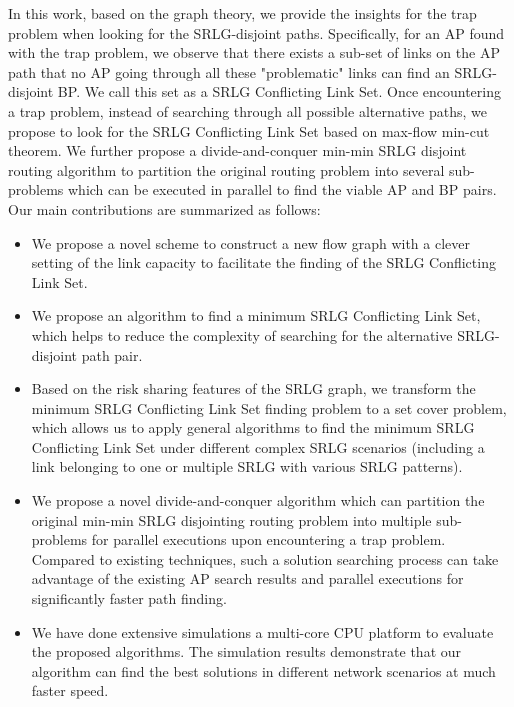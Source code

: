 In this work, based on the graph theory, we provide the insights for the trap problem when looking for the SRLG-disjoint paths. Specifically, for an AP found with the trap problem, we observe that there exists a sub-set of links on the AP path that no AP going through all these "problematic" links can find an SRLG-disjoint BP. We call this set as a SRLG Conflicting Link Set. Once encountering a trap problem, instead of searching through all possible alternative paths, we propose to look for the SRLG Conflicting Link Set based on max-flow min-cut theorem\cite{ford2015flows}. We further propose a divide-and-conquer min-min SRLG disjoint routing algorithm to partition the original routing problem into several sub-problems which can be executed in parallel to find the viable AP and BP pairs. Our main contributions are summarized as follows:
\begin{itemize}
  \item We propose a novel scheme to construct a new flow graph with a clever setting of the link capacity to facilitate the finding of the SRLG Conflicting Link Set.
  \item We propose an algorithm to find a  minimum SRLG Conflicting Link Set, which helps to reduce the complexity of searching for the alternative SRLG-disjoint path pair.
  \item Based on the risk sharing features of the SRLG graph, we transform the minimum SRLG Conflicting Link Set finding problem to a set cover problem, which allows us to apply general algorithms to find the minimum SRLG Conflicting Link Set under different complex SRLG scenarios (including a link belonging to one or multiple SRLG with various SRLG patterns).
  \item We propose a novel divide-and-conquer algorithm which can partition the original min-min SRLG disjointing routing problem into multiple sub-problems for parallel executions upon encountering a trap problem.
      Compared to existing techniques, such a solution searching process can take advantage of the existing AP search results and parallel executions for significantly faster path finding.
  \item  We have done extensive simulations  a multi-core CPU platform to evaluate the proposed algorithms. The simulation results demonstrate that our algorithm can find the best solutions in different network scenarios at much faster speed.
\end{itemize}

